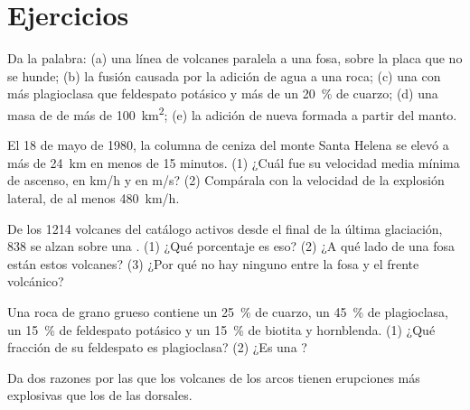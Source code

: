 \section{Ejercicios}

\begin{exercise}[$\star$]\label{exo:g12:subduction-magmatism:1}
Da la palabra: (a) una línea de volcanes paralela a una fosa, sobre la placa
que no se hunde; (b) la fusión causada por la adición de agua a una roca;
(c) una  con más plagioclasa que feldespato potásico y más de
un \qty{20}{\percent} de cuarzo; (d) una masa de  de más de
\qty{100}{km^2}; (e) la adición de nueva  formada a partir
del manto.
\end{exercise}

\begin{exercise}[$\star$]\label{exo:g12:subduction-magmatism:2}
El 18 de mayo de 1980, la columna de ceniza del monte Santa Helena se elevó a
más de \qty{24}{km} en menos de 15 minutos. (1) ¿Cuál fue su velocidad media
mínima de ascenso, en \unit{km/h} y en \unit{m/s}? (2) Compárala con la
velocidad de la explosión lateral, de al menos \qty{480}{km/h}.
\end{exercise}

\begin{exercise}[$\star$]\label{exo:g12:subduction-magmatism:3}
De los 1214 volcanes del catálogo activos desde el final de la última
glaciación, 838 se alzan sobre una . (1) ¿Qué porcentaje es
eso? (2) ¿A qué lado de una fosa están estos volcanes? (3) ¿Por qué no hay
ninguno entre la fosa y el frente volcánico?
\end{exercise}

\begin{exercise}[$\star$]\label{exo:g12:subduction-magmatism:4}
Una roca de grano grueso contiene un \qty{25}{\percent} de cuarzo, un
\qty{45}{\percent} de plagioclasa, un \qty{15}{\percent} de feldespato
potásico y un \qty{15}{\percent} de biotita y hornblenda. (1) ¿Qué fracción
de su feldespato es plagioclasa? (2) ¿Es una ?
\end{exercise}

\begin{exercise}[$\star$]\label{exo:g12:subduction-magmatism:5}
Da dos razones por las que los volcanes de los arcos tienen erupciones más
explosivas que los de las dorsales.
\end{exercise}

